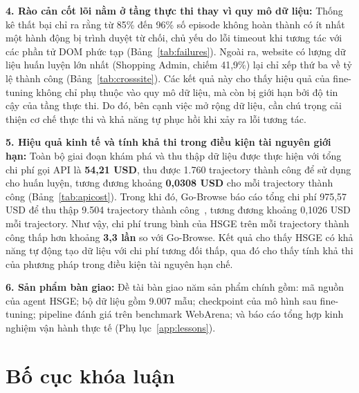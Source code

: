\textbf{4. Rào cản cốt lõi nằm ở tầng thực thi thay vì quy mô dữ liệu:}
Thống kê thất bại chỉ ra rằng từ 85\% đến 96\% số episode không hoàn thành có ít nhất một hành động bị trình duyệt từ chối, chủ yếu do lỗi timeout khi tương tác với các phần tử DOM phức tạp (Bảng~\ref{tab:failures}). Ngoài ra, website có lượng dữ liệu huấn luyện lớn nhất (Shopping Admin, chiếm 41,9\%) lại chỉ xếp thứ ba về tỷ lệ thành công (Bảng~\ref{tab:crosssite}). Các kết quả này cho thấy hiệu quả của fine-tuning không chỉ phụ thuộc vào quy mô dữ liệu, mà còn bị giới hạn bởi độ tin cậy của tầng thực thi. Do đó, bên cạnh việc mở rộng dữ liệu, cần chú trọng cải thiện cơ chế thực thi và khả năng tự phục hồi khi xảy ra lỗi tương tác.

\textbf{5. Hiệu quả kinh tế và tính khả thi trong điều kiện tài nguyên giới hạn:}
Toàn bộ giai đoạn khám phá và thu thập dữ liệu được thực hiện với tổng chi phí gọi API là \textbf{54,21 USD}, thu được 1.760 trajectory thành công để sử dụng cho huấn luyện, tương đương khoảng \textbf{0,0308 USD} cho mỗi trajectory thành công (Bảng~\ref{tab:apicost}). Trong khi đó, Go-Browse báo cáo tổng chi phí 975,57 USD để thu thập 9.504 trajectory thành công~\cite{gandhi2026gobrowse}, tương đương khoảng 0,1026 USD mỗi trajectory. Như vậy, chi phí trung bình của HSGE trên mỗi trajectory thành công thấp hơn khoảng \textbf{3,3 lần} so với Go-Browse. Kết quả cho thấy HSGE có khả năng tự động tạo dữ liệu với chi phí tương đối thấp, qua đó cho thấy tính khả thi của phương pháp trong điều kiện tài nguyên hạn chế.

\textbf{6. Sản phẩm bàn giao:}
Đề tài bàn giao năm sản phẩm chính gồm: mã nguồn của agent HSGE; bộ dữ liệu gồm 9.007 mẫu; checkpoint của mô hình sau fine-tuning; pipeline đánh giá trên benchmark WebArena; và báo cáo tổng hợp kinh nghiệm vận hành thực tế (Phụ lục~\ref{app:lessons}).

\section{Bố cục khóa luận}
\label{sec:intro-organization}

